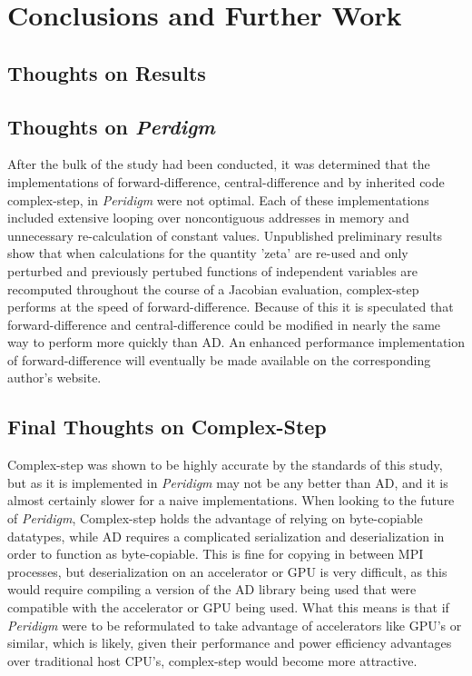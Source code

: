 \documentclass[preprint,12pt]{elsarticle}
\begin{document}
\section{Conclusions and Further Work}

\subsection{Thoughts on Results}


\subsection{Thoughts on \emph{Perdigm}}

After the bulk of the study had been conducted, it was determined that the implementations of
forward-difference, central-difference and by inherited code complex-step, in \emph{Peridigm} were
not optimal. Each of these implementations included extensive looping over noncontiguous addresses
in memory and unnecessary re-calculation of constant values. Unpublished preliminary results show
that when calculations for the quantity 'zeta' are re-used and only perturbed and previously
pertubed functions of independent variables are recomputed throughout the course of a Jacobian
evaluation, complex-step performs at the speed of forward-difference. Because of this it is
speculated that forward-difference and central-difference could be modified in nearly the same way to
perform more quickly than AD. An enhanced performance implementation of forward-difference will
eventually be made available on the corresponding author's website.

\subsection{Final Thoughts on Complex-Step}

Complex-step was shown to be highly accurate by the standards of this study, but as it is
implemented in \emph{Peridigm} may not be any better than AD, and it is almost certainly slower for
a naive implementations. When looking to the future of \emph{Peridigm}, Complex-step holds the
advantage of relying on byte-copiable datatypes, while AD requires a complicated serialization and
deserialization in order to function as byte-copiable. This is fine for copying in between MPI
processes, but deserialization on an accelerator or GPU is very difficult, as this would require
compiling a version of the AD library being used that were compatible with the accelerator or GPU
being used. What this means is that if \emph{Peridigm} were to be reformulated to take advantage of
accelerators like GPU's or similar, which is likely, given their performance and power efficiency
advantages over traditional host CPU's, complex-step would become more attractive.
\end{document}
